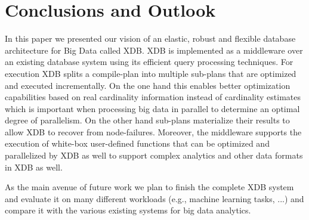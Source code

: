 \documentclass{sig-alternate}
\begin{document}
\section{Conclusions and Outlook}
\label{sec:concl}

In this paper we presented our vision of an elastic, robust and flexible database architecture for Big Data called XDB. XDB is implemented as a middleware over an existing database system using its efficient query processing techniques. 
For execution XDB splits a compile-plan into multiple sub-plans that are optimized and executed incrementally. On the one hand this enables better optimization capabilities based on real cardinality information instead of cardinality estimates which is important when processing big data in parallel to determine an optimal degree of parallelism. On the other hand sub-plans materialize their results to allow XDB to recover from node-failures.
Moreover, the middleware supports the execution of white-box user-defined functions that can be optimized and parallelized by XDB as well to support complex analytics and other data formats in XDB as well.

As the main avenue of future work we plan to finish the complete XDB system and evaluate it on many different workloads (e.g., machine learning tasks, ...) and compare it with the various existing systems for big data analytics.


\small
\end{document}
